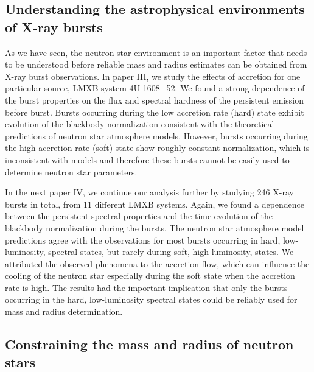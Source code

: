 \subsection{Understanding the astrophysical environments of X-ray bursts}
As we have seen, the neutron star environment is an important factor that needs to be understood before reliable mass and radius estimates can be obtained from X-ray burst observations.
In paper III, we study the effects of accretion for one particular source, LMXB system 4U 1608$-$52.
We found a strong dependence of the burst properties on the flux and spectral hardness of the persistent emission before burst. 
Bursts occurring during the low accretion rate (hard) state exhibit evolution of the blackbody normalization consistent with the theoretical predictions of neutron star atmosphere models. 
However, bursts occurring during the high accretion rate (soft) state show roughly constant normalization, which is inconsistent with models and therefore these bursts cannot be easily used to determine neutron star parameters. 

In the next paper IV, we continue our analysis further by studying 246 X-ray bursts in total, from 11 different LMXB systems.
Again, we found a dependence between the persistent spectral properties and the time evolution of the blackbody normalization during the bursts. 
The neutron star atmosphere model predictions agree with the observations for most bursts occurring in hard, low-luminosity, spectral states, but rarely during soft, high-luminosity, states. 
We attributed the observed phenomena to the accretion flow, which can influence the cooling of the neutron star especially during the soft state when the accretion rate is high.
The results had the important implication that only the bursts occurring in the hard, low-luminosity spectral states could be reliably used for mass and radius determination.





\subsection{Constraining the mass and radius of neutron stars}

